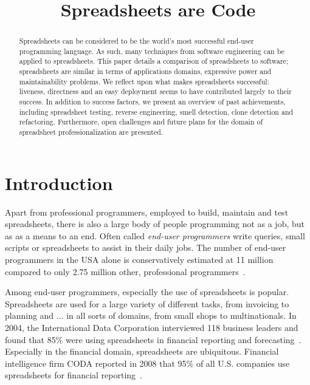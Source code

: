 \documentclass[conference]{IEEEtran}
\begin{document}
\title{Spreadsheets are Code}

\author{
}


\maketitle

\begin{abstract}
Spreadsheets can be considered to be the world's most successful end-user programming language. As such, many techniques from software engineering can be applied to spreadsheets. This paper details a comparison of spreadsheets to software; spreadsheets are similar in terms of applications domains, expressive power and maintainability problems. We reflect upon what makes spreadsheets successful: liveness, directness  and an easy deployment  seems to have contributed largely to their success. In addition to success factors, we present an overview of past achievements, including spreadsheet testing, reverse engineering, smell detection, clone detection and refactoring. Furthermore, open challenges and future plans for the domain of spreadsheet professionalization are presented.
\end{abstract}

\IEEEpeerreviewmaketitle

\section{Introduction}
Apart from professional programmers, employed to build, maintain and test spreadsheets, there is also a large body of people programming not as a job, but as as a means to an end. Often called \emph {end-user programmers} write queries, small scripts or spreadsheets to assist in their daily jobs. The number of end-user programmers in the USA alone is conservatively estimated at 11 million compared to only 2.75 million other, professional programmers~\cite{Scaf2005}. 

Among end-user programmers, especially the use of spreadsheets is popular. Spreadsheets are used for a large variety of different tasks, from invoicing to planning and ...  in all sorts of domains, from small shops to multinationals. In 2004, the International Data Corporation interviewed 118 business leaders and found that 85\% were using spreadsheets in financial reporting and forecasting~\cite{Panko2008}. Especially in the financial domain, spreadsheets are ubiquitous. Financial intelligence firm CODA reported in 2008 that 95\% of all U.S. companies use spreadsheets for financial reporting~\cite{Panko2008}. 
\end{document}
